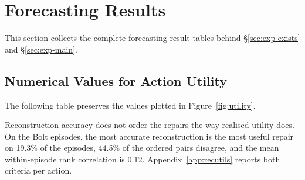\documentclass{article}
\begin{document}
\section{Forecasting Results}
\label{app:full-results}

This section collects the complete forecasting-result tables behind \S\ref{sec:exp-exists}
and \S\ref{sec:exp-main}.

\subsection{Numerical Values for Action Utility}
\label{app:main-values}
The following table preserves the values plotted in Figure~\ref{fig:utility}.

\begin{table}[t]
  \caption{Why the choice has to be made per request. The shares and mean utilities are
  macro-averaged over the evaluation episodes of all three backbones; the episode counts are
  per backbone and identical across backbones, because action availability does not depend on
  the backbone. Oracle-best share is how often an action attains the lowest realised loss of the
  catalog and the shares sum to one. The last two columns cover the episodes where the action
  applies and are measured against \textsc{Keep}.}
  \label{tab:heterogeneity}
  \centering
  \small
  \setlength{\tabcolsep}{4pt}
  \vspace{-2pt}
  {\footnotesize Reconstruction accuracy does not order the repairs the way realised utility
  does. On the Bolt episodes, the most accurate reconstruction is the most useful repair on
  19.3\% of the
  episodes, 44.5\% of the ordered pairs disagree, and the mean within-episode
  rank correlation is 0.12. Appendix~\ref{app:recutils} reports both criteria per
  action.}
\end{table}
\end{document}
